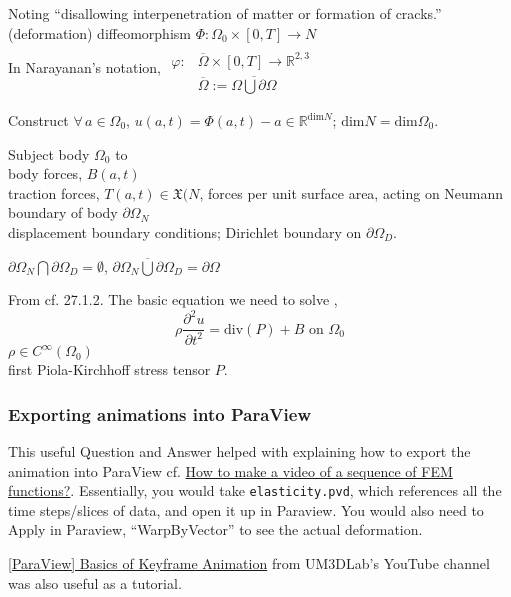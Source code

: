 \documentclass[twoside,landscape,10pt]{amsart}
\theoremstyle{plain}
\theoremstyle{definition}
\theoremstyle{remark}
\begin{document}
\begin{multicols*}{2}
Noting ``disallowing interpenetration of matter or formation of cracks.''  \\

(deformation) diffeomorphism $\Phi: \Omega_0 \times [0,T] \to N$ \\
In Narayanan's notation, $\begin{aligned}
  & \quad \\
   \varphi: & \overline{\Omega}\times [0,T] \to \mathbb{R}^{2,3} \\
  & \overline{\Omega} := \overline{ \Omega \bigcup \partial \Omega } \end{aligned}$

Construct $\forall \, a \in \Omega_0$, $u(a,t) = \Phi(a,t) - a \in \mathbb{R}^{\text{dim}N}$; $\text{dim}N = \text{dim}\Omega_0$.  

Subject body $\Omega_0$ to \\
body forces, $B(a,t)$ \\
traction forces, $T(a,t)  \in \mathfrak{X}(N$, forces per unit surface area, acting on Neumann boundary of body $\partial \Omega_N$ \\
displacement boundary conditions; Dirichlet boundary on $\partial \Omega_D$.  

$\partial \Omega_N \bigcap \partial \Omega_D = \emptyset$, $\overline{ \partial \Omega_N \bigcup \partial \Omega_D} =\partial \Omega$

From cf. 27.1.2. The basic equation we need to solve \cite{FEniCS}, 
\[
\rho \frac{ \partial^2 u}{ \partial t^2} = \text{div}(P) + B \text{ on } \Omega_0
\]
$\rho \in C^{\infty}(\Omega_0)$ \\
first Piola-Kirchhoff stress tensor $P$.  

\subsubsection{Exporting animations into ParaView}

This useful Question and Answer helped with explaining how to export the animation into ParaView cf. \href{http://fenicsproject.org/qa/7390/how-to-make-a-video-of-a-sequence-of-fem-functions}{How to make a video of a sequence of FEM functions?}.  Essentially, you would take \verb|elasticity.pvd|, which references all the time steps/slices of data, and open it up in Paraview.  You would also need to Apply in Paraview, ``WarpByVector'' to see the actual deformation.  

\href{https://www.youtube.com/watch?v=NFnw1AGoh_s}{[ParaView] Basics of Keyframe Animation} from UM3DLab's YouTube channel was also useful as a tutorial.  



\end{multicols*}
\end{document}
